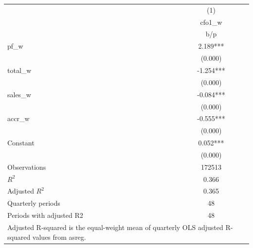 {
\def\sym#1{\ifmmode^{#1}\else\(^{#1}\)\fi}
\begin{tabular}{l*{1}{c}}
\hline\hline
                    &\multicolumn{1}{c}{(1)}\\
                    &\multicolumn{1}{c}{cfo1\_w}\\
                    &         b/p   \\
\hline
pf\_w                &       2.189***\\
                    &     (0.000)   \\
total\_w             &      -1.254***\\
                    &     (0.000)   \\
sales\_w             &      -0.084***\\
                    &     (0.000)   \\
accr\_w              &      -0.555***\\
                    &     (0.000)   \\
Constant            &       0.052***\\
                    &     (0.000)   \\
\hline
Observations        &      172513   \\
\(R^{2}\)           &       0.366   \\
Adjusted \(R^{2}\)  &       0.365   \\
Quarterly periods   &          48   \\
Periods with adjusted R2&          48   \\
\hline\hline
\multicolumn{2}{l}{\footnotesize Adjusted R-squared is the equal-weight mean of quarterly OLS adjusted R-squared values from asreg.}\\
\end{tabular}
}
